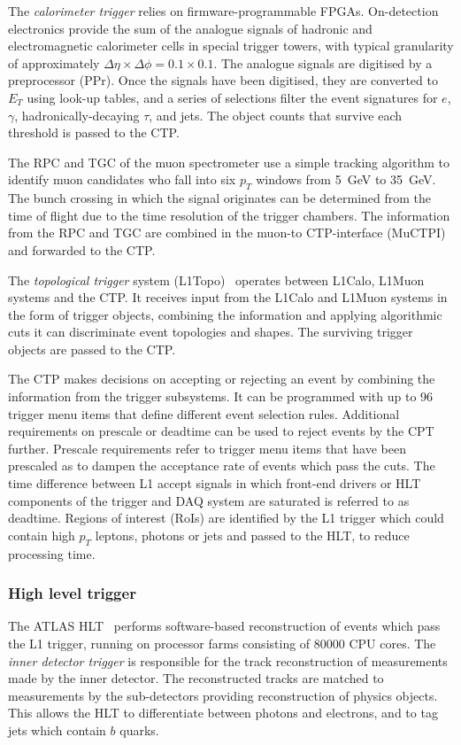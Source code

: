 The \emph{calorimeter trigger} relies on firmware-programmable FPGAs. On-detection electronics provide the sum of the analogue signals of hadronic and electromagnetic calorimeter cells in special trigger towers, with typical granularity of approximately $\Delta\eta \times \Delta\phi = 0.1 \times 0.1$. The analogue signals are digitised by a preprocessor (PPr). Once the signals have been digitised, they are converted to $E_{T}$ using look-up tables, and a series of selections filter the event signatures for $e$, $\gamma$, hadronically-decaying $\tau$, and jets. The object counts that survive each threshold is passed to the CTP. 

The RPC and TGC of the muon spectrometer use a simple tracking algorithm to identify muon candidates who fall into six $p_{T}$ windows from \SI{5}{\giga\electronvolt} to \SI{35}{\giga\electronvolt}. The bunch crossing in which the signal originates can be determined from the time of flight due to the time resolution of the trigger chambers. The information from the RPC and TGC are combined in the muon-to CTP-interface (MuCTPI) and forwarded to the CTP. 

The \emph{topological trigger} system (L1Topo)~\cite{ATLAS:L1Topo} operates between L1Calo, L1Muon systems and the CTP. It receives input from the L1Calo and L1Muon systems in the form of trigger objects, combining the information and applying algorithmic cuts it can discriminate event topologies and shapes. The surviving trigger objects are passed to the CTP.

The CTP makes decisions on accepting or rejecting an event by combining the information from the trigger subsystems. It can be programmed with up to 96 trigger menu items that define different event selection rules. Additional requirements on prescale or deadtime can be used to reject events by the CPT further. Prescale requirements refer to trigger menu items that have been prescaled as to dampen the acceptance rate of events which pass the cuts. The time difference between L1 accept signals in which front-end drivers or HLT components of the trigger and DAQ system are saturated is referred to as deadtime. Regions of interest (RoIs) are identified by the L1 trigger which could contain high $p_T$ leptons, photons or jets and passed to the HLT, to reduce processing time. 

\subsubsection{High level trigger}
The ATLAS HLT~\cite{ATLAS:HLT-TDR,ATLAS:TDAQ-Run2} performs software-based reconstruction of events which pass the L1 trigger, running on processor farms consisting of 80000 CPU cores. The \emph{inner detector trigger} is responsible for the track reconstruction of measurements made by the inner detector. The reconstructed tracks are matched to measurements by the sub-detectors providing reconstruction of physics objects. This allows the HLT to differentiate between photons and electrons, and to tag jets which contain $b$ quarks. 

